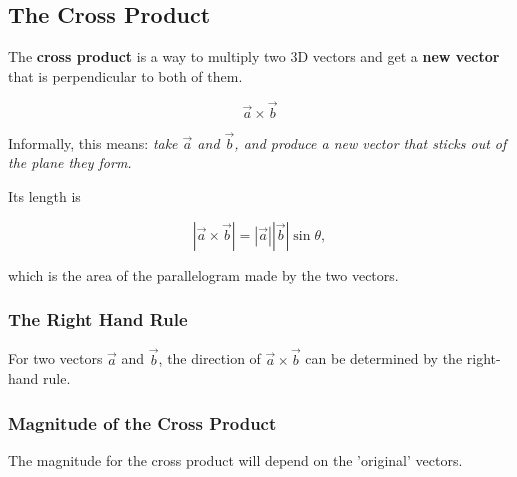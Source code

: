 \subsection{The Cross Product}
\begin{definition}
The \textbf{cross product} is a way to multiply two 3D vectors and get a
\textbf{new vector} that is perpendicular to both of them.

\[
\vec{a} \times \vec{b}
\]

Informally, this means: \emph{take \(\vec{a}\) and \(\vec{b}\), and produce
a new vector that sticks out of the plane they form.}

Its length is

\[
|\vec{a} \times \vec{b}| = |\vec{a}| |\vec{b}| \sin \theta,
\]

which is the area of the parallelogram made by the two vectors.
\end{definition}

\subsubsection{The Right Hand Rule}
For two vectors $\vec{a}$ and $\vec{b}$, the direction of $\vec{a} \times \vec{b}$ can be determined by the right-hand rule. 

\begin{center}
\end{center}

\subsubsection{Magnitude of the Cross Product}
The magnitude for the cross product will depend on the 'original' vectors. 

